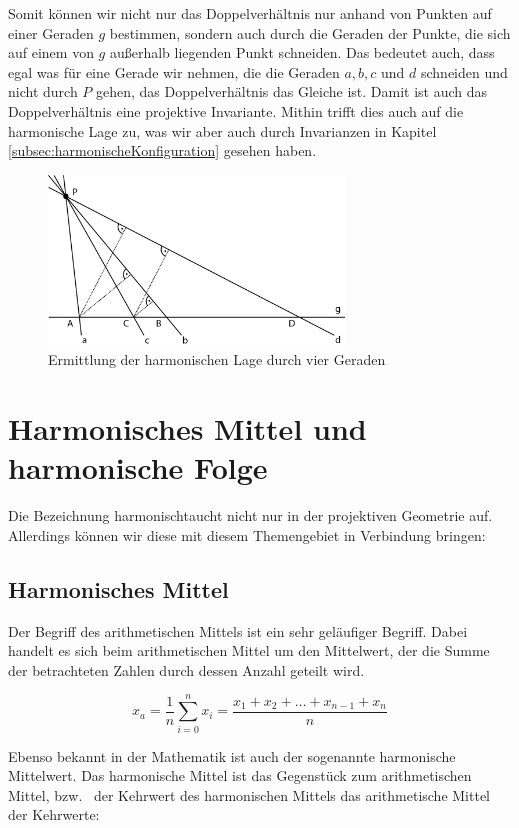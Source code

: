 \documentclass[12pt,a4paper]{article}
\begin{document}
Somit können wir nicht nur das Doppelverhältnis nur anhand von Punkten auf einer Geraden $g$ bestimmen, sondern auch durch die Geraden der Punkte, die sich auf einem von $g$ außerhalb liegenden Punkt schneiden. Das bedeutet auch, dass egal was für eine Gerade wir nehmen, die die Geraden $a, b, c$ und $d$ schneiden und nicht durch $P$ gehen, das Doppelverhältnis das Gleiche ist. Damit ist auch das Doppelverhältnis eine projektive Invariante. Mithin trifft dies auch auf die harmonische Lage zu, was wir aber auch durch Invarianzen in Kapitel \ref{subsec:harmonischeKonfiguration} gesehen haben.

\begin{figure}[htbp] 
\centering
\includegraphics[width=0.7\textwidth]{Bilder/vierGeraden.png}
\caption{Ermittlung der harmonischen Lage durch vier Geraden}
\label{fig:vierGeraden}
\end{figure}

\newpage
\section{Harmonisches Mittel und harmonische Folge}
\label{sec:harmMittel}

Die Bezeichnung \glqq harmonisch\grqq taucht nicht nur in der projektiven Geometrie auf. Allerdings können wir diese mit diesem Themengebiet in Verbindung bringen:

\subsection{Harmonisches Mittel}

Der Begriff des arithmetischen Mittels ist ein sehr geläufiger Begriff. Dabei handelt es sich beim arithmetischen Mittel um den Mittelwert, der die Summe der betrachteten Zahlen durch dessen Anzahl geteilt wird.

\[x_a = \dfrac{1}{n} \sum_{i=0}^n x_i = \dfrac{x_1 + x_2 + \dots + x_{n-1} + x_n}{n}\]

Ebenso bekannt in der Mathematik ist auch der sogenannte harmonische Mittelwert. Das harmonische Mittel ist das Gegenstück zum arithmetischen Mittel, bzw.~ der Kehrwert des harmonischen Mittels das arithmetische Mittel der Kehrwerte:
\end{document}

